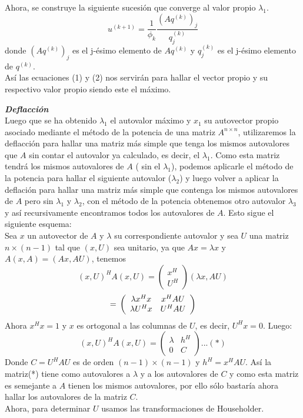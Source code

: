 \documentclass[12pt,a4paper]{article}
\begin{document}
\begin{multicols}{2}
	Ahora, se construye la siguiente sucesión que converge al valor propio $\lambda_{1}$.
	\begin{equation}\label{eigenvalue_iter}
	u^{(k+1)} = \frac{1}{\phi_{k}}\frac{(Aq^{(k)})_{j}}{q^{(k)}_{j}}
	\end{equation}
	donde $(Aq^{(k)})_{j}$ es el j-ésimo elemento de $Aq^{(k)}$ y $q^{(k)}_{j}$ es el j-ésimo elemento de $q^{(k)}.$\\
	Así las ecuaciones (1) y (2) nos servirán para hallar el vector propio y su respectivo valor propio siendo este el máximo.
	
	
	\noindent\textbf{\textit{Deflacción}}\\
	\noindent Luego que se ha obtenido $\lambda_{1}$ el autovalor máximo y $x_{1}$ su autovector propio asociado mediante el método de la potencia de una matriz $A^{n\times n}$, utilizaremos la deflacción para hallar una matriz más simple que tenga los mismos autovalores que $A$ sin contar el autovalor ya calculado, es decir, el $\lambda_{1}$. Como esta matriz tendrá los mismos autovalores de $A$ ( sin el $\lambda_{1}$), podemos aplicarle el método de la potencia para hallar el siguiente autovalor ($\lambda_{2}$) y luego volver a aplicar la deflación para hallar una matriz más simple que contenga los mismos autovalores de $A$ pero sin $\lambda_{1}$ y $\lambda_{2}$, con el método de la potencia obtenemos otro autovalor $\lambda_{3}$ y así recursivamente encontramos todos los autovalores de $A$.
	Esto sigue el siguiente esquema:\\
	Sea $x$ un autovector de $A$ y $\lambda $ su correspondiente autovalor y sea $U$ una matriz $n\times(n-1)$ tal que $(x,U)$ sea unitario, ya que $Ax=\lambda x$ y $A(x,A)=(Ax,AU)$, tenemos$$(x,U)^{H}A(x,U)=\left(\begin{array}{c}
	x^{H} \\
	U^{H} 
	\end{array}\right)\left(\lambda x,AU\right)$$ $$=\newline \left(\begin{array}{cc}
	\lambda x^{H}x  &  x^{H}AU\\
	\lambda U^{H}x  & U^{H}AU
	\end{array}\right)$$
	Ahora $x^{H}x=1$  y $x$ es ortogonal a las columnas de $U$, es decir, $U^{H}x=0$. Luego:\\
	$$(x,U)^{H}A(x,U)=\left(\begin{array}{cc}
	\lambda   &  h^{H}\\
	0 & C
	\end{array}\right)...(*)$$ Donde $C=U^{H}AU$ es de orden  $(n-1)\times (n-1)$ y $h^{H}=x^{H}AU$. Así la matriz(*) tiene como autovalores a $\lambda$ y a los autovalores de $C$ y como esta matriz es semejante a $A$ tienen los mismos autovalores, por ello sólo bastaría ahora hallar los autovalores de la matriz $C$.\\
	Ahora, para determinar $U$ usamos las transformaciones de Householder.\\
	

\end{multicols}
\end{document}
